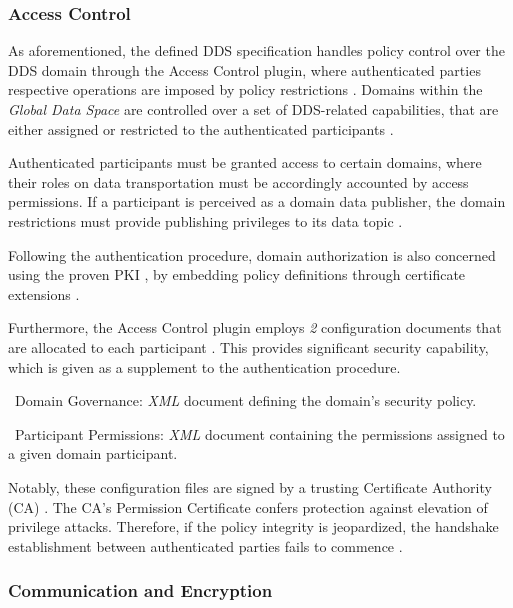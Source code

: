 \subsubsection{Access Control}

As aforementioned, the defined DDS specification handles policy control over the DDS domain through the Access Control plugin, where authenticated parties respective operations are imposed by policy restrictions \cite{dds-s, white2019network}. Domains within the \textit{Global Data Space} are controlled over a set of DDS-related capabilities, that are either assigned or restricted to the authenticated participants \cite{ros-dds-integration}. 

Authenticated participants must be granted access to certain domains, where their roles on data transportation must be accordingly accounted by access permissions. If a participant is perceived as a domain data publisher, the domain restrictions must provide publishing privileges to its data topic \cite{white2019network}. 

Following the authentication procedure, domain authorization is also concerned using the proven PKI \cite{ros-dds-integration}, by embedding policy definitions through certificate extensions \cite{white2016sros}. 

Furthermore, the Access Control plugin employs \textit{2} configuration documents that are allocated to each participant \cite{white2019network}. This provides significant security capability, which is given as a supplement to the authentication procedure.

\textbullet\ Domain Governance: \textit{XML} document defining the domain's security policy.

\textbullet\ Participant Permissions: \textit{XML} document containing the permissions assigned to a given domain participant.

Notably, these configuration files are signed by a trusting Certificate Authority (CA) \cite{ros-dds-integration}. The CA's Permission Certificate confers protection against elevation of privilege attacks. Therefore, if the policy integrity is jeopardized, the handshake establishment between authenticated parties fails to commence \cite{white2016sros}.

\subsubsection{Communication and Encryption}


